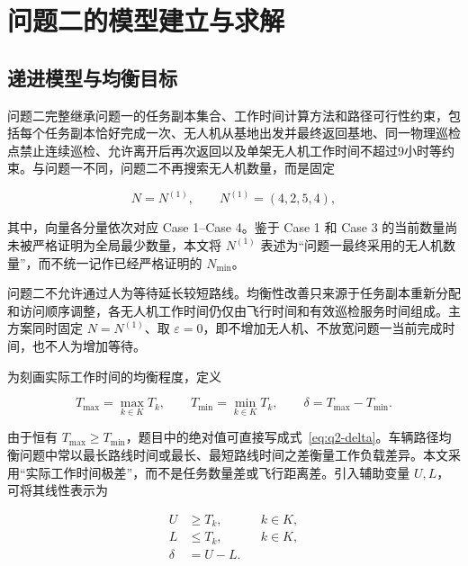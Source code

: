 \documentclass[UTF8,a4paper,12pt]{ctexart}
\numberwithin{equation}{section}
\numberwithin{equation}{section}
\begin{document}
\section{问题二的模型建立与求解}
\subsection{递进模型与均衡目标}

问题二完整继承问题一的任务副本集合、工作时间计算方法和路径可行性约束，包括每个任务副本恰好完成一次、无人机从基地出发并最终返回基地、同一物理巡检点禁止连续巡检、允许离开后再次返回以及单架无人机工作时间不超过9小时等约束。与问题一不同，问题二不再搜索无人机数量，而是固定

\begin{equation}
  N=N^{(1)},
  \qquad
  N^{(1)}=(4,2,5,4),
  \label{eq:q2-fixed-n}
\end{equation}

其中，向量各分量依次对应 Case 1--Case 4。鉴于 Case 1 和 Case 3 的当前数量尚未被严格证明为全局最少数量，本文将 \(N^{(1)}\) 表述为“问题一最终采用的无人机数量”，而不统一记作已经严格证明的 \(N_{\min}\)。

问题二不允许通过人为等待延长较短路线。均衡性改善只来源于任务副本重新分配和访问顺序调整，各无人机工作时间仍仅由飞行时间和有效巡检服务时间组成。主方案同时固定 $N=N^{(1)}$、取 $\varepsilon=0$，即不增加无人机、不放宽问题一当前完成时间，也不人为增加等待。

为刻画实际工作时间的均衡程度，定义

\begin{equation}
  T_{\max}=\max_{k\in K}T_k,
  \qquad
  T_{\min}=\min_{k\in K}T_k,
  \qquad
  \delta=T_{\max}-T_{\min}.
  \label{eq:q2-delta}
\end{equation}

由于恒有 \(T_{\max}\geq T_{\min}\)，题目中的绝对值可直接写成式~\eqref{eq:q2-delta}。车辆路径均衡问题中常以最长路线时间或最长、最短路线时间之差衡量工作负载差异\cite{matl2018,lehuedepeton2020}。本文采用“实际工作时间极差”，而不是任务数量差或飞行距离差。引入辅助变量 \(U,L\)，可将其线性表示为

\begin{equation}
\begin{aligned}
  U&\geq T_k, &&k\in K,\\
  L&\leq T_k, &&k\in K,\\
  \delta&=U-L.
\end{aligned}
\label{eq:q2-balance-variables}
\end{equation}
\end{document}
